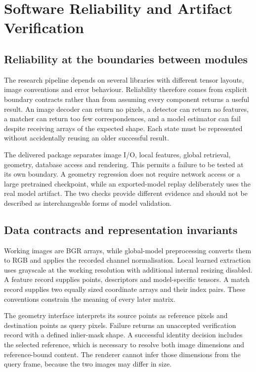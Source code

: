 \chapter{Software Reliability and Artifact Verification}\label{ch:reliability}
\section{Reliability at the boundaries between modules}
The research pipeline depends on several libraries with different tensor layouts, image conventions and error behaviour. Reliability therefore comes from explicit boundary contracts rather than from assuming every component returns a useful result. An image decoder can return no pixels, a detector can return no features, a matcher can return too few correspondences, and a model estimator can fail despite receiving arrays of the expected shape. Each state must be represented without accidentally reusing an older successful result.

The delivered package separates image I/O, local features, global retrieval, geometry, database access and rendering. This permits a failure to be tested at its own boundary. A geometry regression does not require network access or a large pretrained checkpoint, while an exported-model replay deliberately uses the real model artifact. The two checks provide different evidence and should not be described as interchangeable forms of model validation.

\section{Data contracts and representation invariants}
Working images are BGR arrays, while global-model preprocessing converts them to RGB and applies the recorded channel normalisation. Local learned extraction uses grayscale at the working resolution with additional internal resizing disabled. A feature record supplies points, descriptors and model-specific tensors. A match record supplies two equally sized coordinate arrays and their index pairs. These conventions constrain the meaning of every later matrix.

The geometry interface interprets its source points as reference pixels and destination points as query pixels. Failure returns an unaccepted verification record with a defined inlier-mask shape. A successful identity decision includes the selected reference, which is necessary to resolve both image dimensions and reference-bound content. The renderer cannot infer those dimensions from the query frame, because the two images may differ in size.

